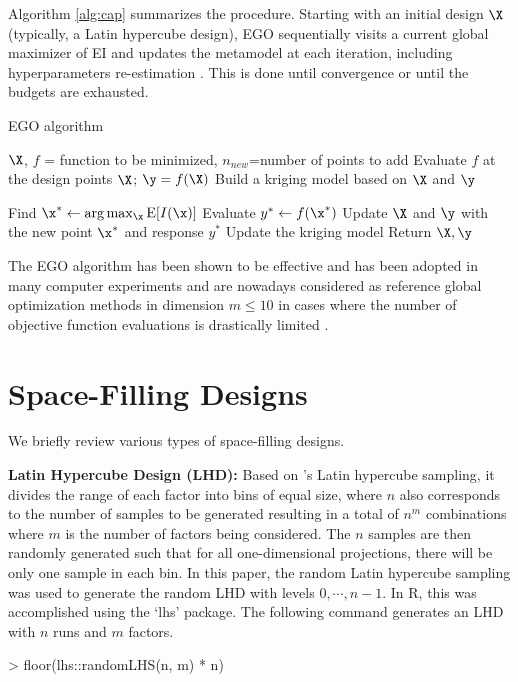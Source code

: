 \documentclass [PhD] {package/uclathes}
\begin{document}
Algorithm \ref{alg:cap} summarizes the procedure.
Starting with an initial design $\X$ (typically, a Latin hypercube design), EGO sequentially visits a current global maximizer of EI and updates the metamodel at each iteration, including hyperparameters re-estimation \parencite{roustant2012dicekriging}. This is done until convergence or until the budgets are exhausted.

\begin{algorithm}[H]
    \caption{EGO algorithm}\label{alg:cap}
    \begin{algorithmic}[1]
        \Require $\X$, $f$ = function to be minimized, $n_{new}$=number of points to add
        \State Evaluate $f$ at the design points $\X$; $\y=f(\X)$
        \State Build a kriging model based on $\X$ and $\y$

        \State Find $\x^* \gets \arg\max_{\x}\mathrm{E}[I(\x)]$
        \State Evaluate $y^* \gets f(\x^*)$
        \State Update $\X$ and $\y$ with the new point $\x^*$ and response $y^*$
        \State Update the kriging model
\EndFor
\State Return $\X, \y$
\end{algorithmic}
\end{algorithm}

The EGO algorithm has been shown to be effective and has been adopted in many computer experiments and are nowadays considered as reference global optimization methods in dimension $m\le 10$ in cases where the number of objective function evaluations is drastically limited \parencite{jones2001taxonomy}.


\section{Space-Filling Designs}\label{sec:designs}
We briefly review various types of space-filling designs.

\textbf{Latin Hypercube Design (LHD):}
 Based on \textcite{mckay1992latin}'s Latin hypercube sampling, it divides the range of each factor into  bins of equal size, where $n$ also corresponds to the number of samples to be generated resulting in a total of $n^m$ combinations where $m$ is the number of factors  being considered. The $n$ samples are then randomly generated such that for all one-dimensional projections, there will be only one sample in each bin.
 In this paper, the random Latin hypercube sampling was used to generate the random LHD  with levels $0,\cdots,n-1$. In R, this was accomplished using the `lhs' package. The following command generates an LHD with $n$ runs and $m$ factors.
\begin{Schunk}
\begin{Sinput}
> floor(lhs::randomLHS(n, m) * n)
\end{Sinput}
\end{Schunk}
\end{document}
